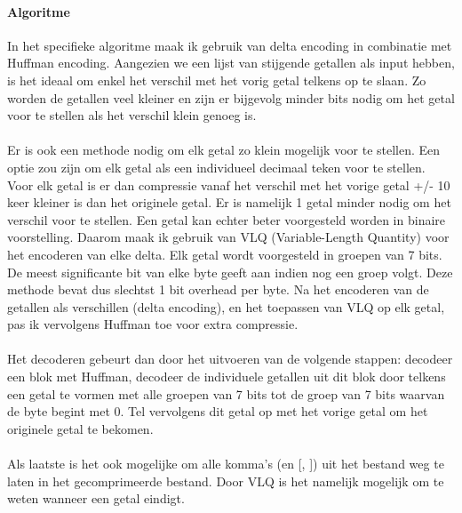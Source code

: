 \documentclass[11pt, a4paper]{article}
\begin{document}
\paragraph{Algoritme}
In het specifieke algoritme maak ik gebruik van delta encoding in combinatie met Huffman encoding. Aangezien we een lijst van stijgende getallen als input hebben, is het ideaal om enkel het  verschil met het vorig getal telkens op te slaan. Zo worden de getallen veel kleiner en zijn er bijgevolg minder bits nodig om het getal voor te stellen als het verschil klein genoeg is. 
\\\\Er is ook een methode nodig om elk getal zo klein mogelijk voor te stellen. Een optie zou zijn om elk getal als een individueel decimaal teken voor te stellen. Voor elk getal is er dan compressie vanaf het verschil met het vorige getal +/- 10 keer kleiner is dan het originele getal. Er is namelijk 1 getal minder nodig om het verschil voor te stellen. Een getal kan echter beter voorgesteld worden in binaire voorstelling. Daarom maak ik gebruik van VLQ (Variable-Length Quantity) voor het encoderen van elke delta. Elk getal wordt voorgesteld in groepen van 7 bits. De meest significante bit van elke byte geeft aan indien nog een groep volgt. Deze methode bevat dus slechtst 1 bit overhead per byte. Na het encoderen van de getallen als verschillen (delta encoding), en het toepassen van VLQ op elk getal, pas ik vervolgens Huffman toe voor extra compressie. 
\\\\Het decoderen gebeurt dan door het uitvoeren van de volgende stappen: decodeer een blok met Huffman, decodeer de individuele getallen uit dit blok door telkens een getal te vormen met alle groepen van 7 bits tot de groep van 7 bits waarvan de byte begint met 0. Tel vervolgens dit getal op met het vorige getal om het originele getal te bekomen. 
\\\\Als laatste is het ook mogelijke om alle komma's (en [, ]) uit het bestand weg te laten in het gecomprimeerde bestand. Door VLQ is het namelijk mogelijk om te weten wanneer een getal eindigt.
\end{document}

